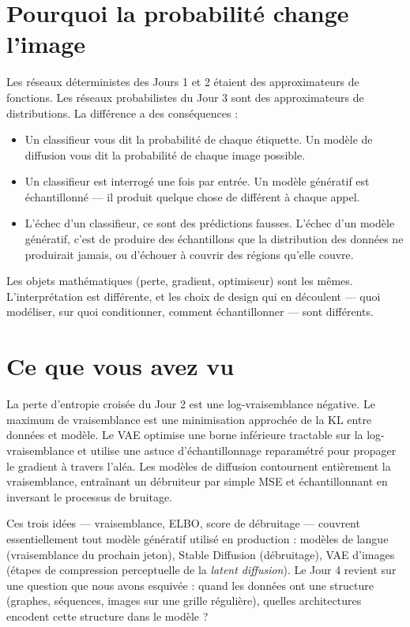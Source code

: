 \section{Pourquoi la probabilité change l'image}

Les réseaux déterministes des Jours 1 et 2 étaient des approximateurs de fonctions. Les réseaux probabilistes du Jour 3 sont des approximateurs de distributions. La différence a des conséquences :

\begin{itemize}
  \item Un classifieur vous dit la probabilité de chaque étiquette. Un modèle de diffusion vous dit la probabilité de chaque image possible.
  \item Un classifieur est interrogé une fois par entrée. Un modèle génératif est échantillonné --- il produit quelque chose de différent à chaque appel.
  \item L'échec d'un classifieur, ce sont des prédictions fausses. L'échec d'un modèle génératif, c'est de produire des échantillons que la distribution des données ne produirait jamais, ou d'échouer à couvrir des régions qu'elle couvre.
\end{itemize}

Les objets mathématiques (perte, gradient, optimiseur) sont les mêmes. L'interprétation est différente, et les choix de design qui en découlent --- quoi modéliser, sur quoi conditionner, comment échantillonner --- sont différents.

\section{Ce que vous avez vu}

La perte d'entropie croisée du Jour 2 est une log-vraisemblance négative. Le maximum de vraisemblance est une minimisation approchée de la KL entre données et modèle. Le VAE optimise une borne inférieure tractable sur la log-vraisemblance et utilise une astuce d'échantillonnage reparamétré pour propager le gradient à travers l'aléa. Les modèles de diffusion contournent entièrement la vraisemblance, entraînant un débruiteur par simple MSE et échantillonnant en inversant le processus de bruitage.

Ces trois idées --- vraisemblance, ELBO, score de débruitage --- couvrent essentiellement tout modèle génératif utilisé en production : modèles de langue (vraisemblance du prochain jeton), Stable Diffusion (débruitage), VAE d'images (étapes de compression perceptuelle de la \emph{latent diffusion}). Le Jour 4 revient sur une question que nous avons esquivée : quand les données ont une structure (graphes, séquences, images sur une grille régulière), quelles architectures encodent cette structure dans le modèle ?

